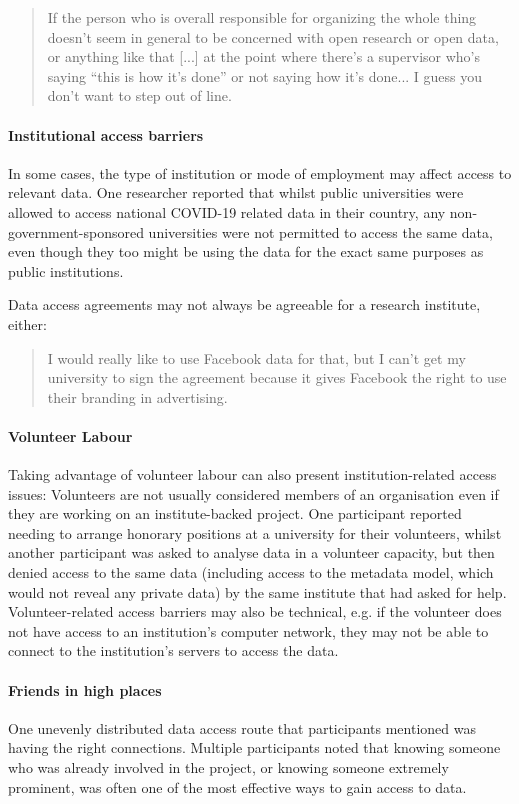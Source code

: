 \documentclass{CUP-JNL-DAP}%
\begin{document}
\blockquote{If the person who is overall responsible for organizing the whole thing doesn't seem in general to be concerned with open research or open data, or anything like that [...] at the point where there's a supervisor who's saying \enquote{this is how it's done} or not saying how it's done... I guess you don't want to step out of line.}

\paragraph{Institutional access barriers} 
In some cases, the type of institution or mode of employment may affect access to relevant data. One researcher reported that whilst public universities were allowed to access national COVID-19 related data in their country, any non-government-sponsored universities were not permitted to access the same data, even though they too might be using the data for the exact same purposes as public institutions. 

Data access agreements may not always be agreeable for a research institute, either: 

\blockquote{I would really like to use Facebook data for that, but I can't get my university to sign the agreement because it gives Facebook the right to use their branding in advertising.}

\paragraph{Volunteer Labour} 

Taking advantage of volunteer labour can also present institution-related access issues: Volunteers are not usually considered members of an organisation even if they are working on an institute-backed project. One participant reported needing to arrange honorary positions at a university for their volunteers, whilst another participant was asked to analyse data in a volunteer capacity, but then denied access to the same data (including access to the metadata model, which would not reveal any private data) by the same institute that had asked for help. Volunteer-related access barriers may also be technical, e.g. if the volunteer does not have access to an institution's computer network, they may not be able to connect to the institution's servers to access the data.

\paragraph{Friends in high places} 
One unevenly distributed data access route that participants mentioned was having the right connections. Multiple participants noted that knowing someone who was already involved in the project, or knowing someone extremely prominent, was often one of the most effective ways to gain access to data. 
\end{document}
